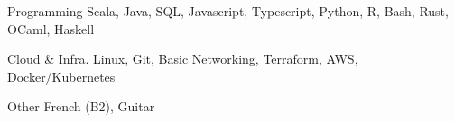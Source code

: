 


\begin{cvskills}


\cvskill
{Programming} %
{Scala, Java, SQL, Javascript, Typescript, Python, R, Bash, Rust, OCaml, Haskell} %


\cvskill
{Cloud \& Infra.} %
{Linux, Git, Basic Networking, Terraform, AWS, Docker/Kubernetes} %


\cvskill
{Other} %
{French (B2), Guitar} %


\end{cvskills}
